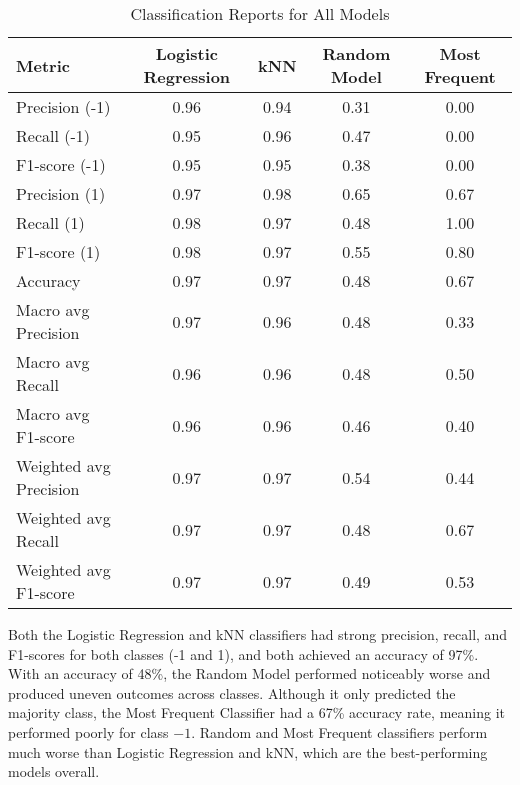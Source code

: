 \documentclass[a4paper,10pt]{article}
\begin{document}
\begin{enumerate}
\begin{table}[ht]
    \centering
    \caption{Classification Reports for All Models}
    \begin{tabular}{l|c|c|c|c}
        \hline
        Metric & Logistic Regression & kNN & Random Model & Most Frequent \\
        \hline
        Precision (-1) & 0.96 & 0.94 & 0.31 & 0.00 \\
        Recall (-1)    & 0.95 & 0.96 & 0.47 & 0.00 \\
        F1-score (-1)  & 0.95 & 0.95 & 0.38 & 0.00 \\
        Precision (1)  & 0.97 & 0.98 & 0.65 & 0.67 \\
        Recall (1)     & 0.98 & 0.97 & 0.48 & 1.00 \\
        F1-score (1)   & 0.98 & 0.97 & 0.55 & 0.80 \\
        \hline
        Accuracy       & 0.97 & 0.97 & 0.48 & 0.67 \\
        Macro avg Precision & 0.97 & 0.96 & 0.48 & 0.33 \\
        Macro avg Recall    & 0.96 & 0.96 & 0.48 & 0.50 \\
        Macro avg F1-score  & 0.96 & 0.96 & 0.46 & 0.40 \\
        Weighted avg Precision & 0.97 & 0.97 & 0.54 & 0.44 \\
        Weighted avg Recall    & 0.97 & 0.97 & 0.48 & 0.67 \\
        Weighted avg F1-score  & 0.97 & 0.97 & 0.49 & 0.53 \\
        \hline
    \end{tabular}
    \label{tab:classification_reports}
\end{table}
Both the Logistic Regression and kNN classifiers had strong precision, recall, and F1-scores for both classes (-1 and 1), and both achieved an accuracy of 97\%. With an accuracy of 48\%, the Random Model performed noticeably worse and produced uneven outcomes across classes. Although it only predicted the majority class, the Most Frequent Classifier had a 67\% accuracy rate, meaning it performed poorly for class $-1$. Random and Most Frequent classifiers perform much worse than Logistic Regression and kNN, which are the best-performing models overall.


\end{enumerate}
\end{document}
